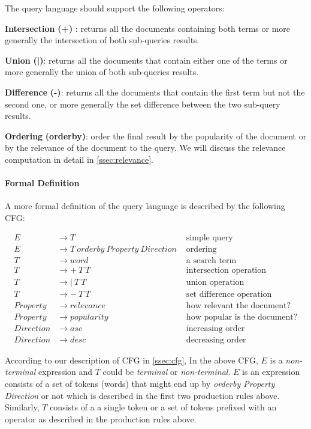 \documentclass[11pt]{article}
\begin{document}
The query language should support the following operators:
\begin{description}
\item \textbf{Intersection} \textbf{(+)} : returns all the documents containing both terms or more generally the intersection of both sub-queries results. 
\item \textbf{Union} \textbf{(|)}: returns all the documents that contain either one of the terms or more generally the union of  both sub-queries results.
\item \textbf{Difference} \textbf{(-)}: returns all the documents that contain the first term but not the second one, or more generally the set difference between the two sub-query results.
\item \textbf{Ordering} \textbf{(orderby)}: order the final result by the popularity of the document or by the relevance of the document to the query. We will discuss the relevance computation in detail in \ref{ssec:relevance}.
\end{description}


\paragraph{Formal Definition}  A more formal definition of the query language is described by the following CFG:
  
\begin{align*}
E &\to T &\mbox{ simple query}\\
E &\to T \ orderby \ Property \ Direction &\mbox{ ordering}\\
T &\to word &\mbox{ a search term} \\
T &\to + \ T \ T & \mbox{ intersection operation}  \\
T &\to | \ T \ T & \mbox{ union operation}  \\
T &\to - \ T \ T & \mbox{ set difference operation}  \\
Property &\to relevance &\mbox{ how relevant the document?}\\
Property &\to popularity &\mbox{ how popular is the document?}\\
Direction &\to asc &\mbox{ increasing order}\\
Direction &\to desc &\mbox{ decreasing order}
\end{align*}

According to our description of CFG in \ref{ssec:cfg}, In the above CFG, $E$ is a \textit{non-terminal} expression and $T$ could be \textit{terminal} or \textit{non-terminal}. $E$ is an expression consists of a set of tokens (words) that might end up by \textit{orderby Property Direction} or not which is described in the first two production rules above. Similarly, $T$ consists of a a single token or a set of tokens prefixed with an operator as described in the production rules above.
\end{document}

